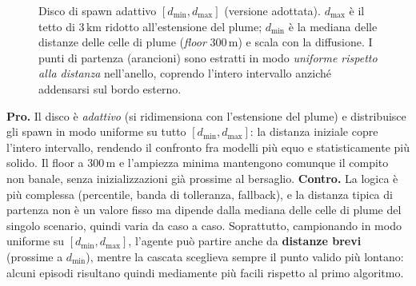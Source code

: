 \begin{figure}[H]
\centering
{}
\caption{Disco di spawn adattivo $[d_{\min},d_{\max}]$ (versione adottata). $d_{\max}$ \`e il
         tetto di $3\,\text{km}$ ridotto all'estensione del plume; $d_{\min}$ \`e la mediana
         delle distanze delle celle di plume (\emph{floor} $300\,\text{m}$) e scala con la
         diffusione. I punti di partenza (arancioni) sono estratti in modo \emph{uniforme
         rispetto alla distanza} nell'anello, coprendo l'intero intervallo anzich\'e
         addensarsi sul bordo esterno.}
\label{fig:spawn_disk}
\end{figure}

\textbf{Pro.} Il disco \`e \emph{adattivo} (si ridimensiona con l'estensione del plume) e
distribuisce gli spawn in modo uniforme su tutto $[d_{\min},d_{\max}]$: la distanza iniziale
copre l'intero intervallo, rendendo il confronto fra modelli pi\`u equo e statisticamente
pi\`u solido. Il floor a $300\,\text{m}$ e l'ampiezza minima mantengono comunque il compito
non banale, senza inizializzazioni gi\`a prossime al bersaglio.
\textbf{Contro.} La logica \`e pi\`u complessa (percentile, banda di tolleranza, fallback),
e la distanza tipica di partenza non \`e un valore fisso ma dipende dalla mediana delle celle
di plume del singolo scenario, quindi varia da caso a caso. Soprattutto, campionando in modo
uniforme su $[d_{\min},d_{\max}]$, l'agente pu\`o partire anche da \textbf{distanze brevi}
(prossime a $d_{\min}$), mentre la cascata sceglieva sempre il punto valido pi\`u lontano:
alcuni episodi risultano quindi mediamente pi\`u facili rispetto al primo algoritmo.

